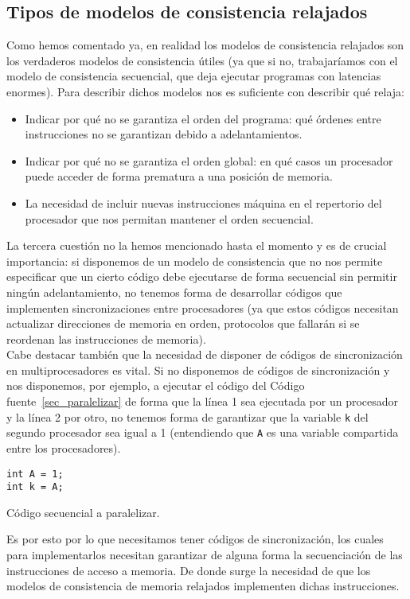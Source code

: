 \subsection{Tipos de modelos de consistencia relajados}
Como hemos comentado ya, en realidad los modelos de consistencia relajados son los verdaderos modelos de consistencia útiles (ya que si no, trabajaríamos con el modelo de consistencia secuencial, que deja ejecutar programas con latencias enormes). Para describir dichos modelos nos es suficiente con describir qué relaja:
\begin{itemize}
    \item Indicar por qué no se garantiza el orden del programa: qué órdenes entre instrucciones no se garantizan debido a adelantamientos.
    \item Indicar por qué no se garantiza el orden global: en qué casos un procesador puede acceder de forma prematura a una posición de memoria.
    \item La necesidad de incluir nuevas instrucciones máquina en el repertorio del procesador que nos permitan mantener el orden secuencial.
\end{itemize}
La tercera cuestión no la hemos mencionado hasta el momento y es de crucial importancia: si disponemos de un modelo de consistencia que no nos permite especificar que un cierto código debe ejecutarse de forma secuencial sin permitir ningún adelantamiento, no tenemos forma de desarrollar códigos que implementen sincronizaciones entre procesadores (ya que estos códigos necesitan actualizar direcciones de memoria en orden, protocolos que fallarán si se reordenan las instrucciones de memoria).\\

Cabe destacar también que la necesidad de disponer de códigos de sincronización en multiprocesadores es vital. Si no disponemos de códigos de sincronización y nos disponemos, por ejemplo, a ejecutar el código del Código fuente~\ref{sec_paralelizar} de forma que la línea 1 sea ejecutada por un procesador y la línea 2 por otro, no tenemos forma de garantizar que la variable \verb|k| del segundo procesador sea igual a 1 (entendiendo que \verb|A| es una variable compartida entre los procesadores).
\begin{listing}[H]
    \centering
    \begin{verbatim}
int A = 1;
int k = A;
    \end{verbatim}
    \caption{Código secuencial a paralelizar.}
    \label{sec_paralelizar}
\end{listing}
Es por esto por lo que necesitamos tener códigos de sincronización, los cuales para implementarlos necesitan garantizar de alguna forma la secuenciación de las instrucciones de acceso a memoria. De donde surge la necesidad de que los modelos de consistencia de memoria relajados implementen dichas instrucciones.\\

